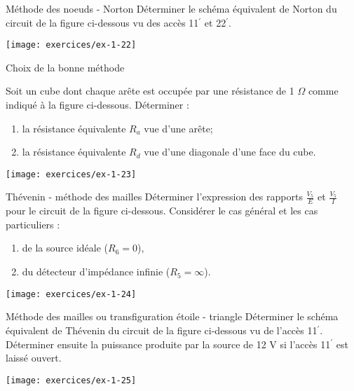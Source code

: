 \begin{exercise}{Méthode des noeuds - Norton}\label{ex:mg-5}
Déterminer le schéma équivalent de Norton du circuit
de la  figure ci-dessous vu des accès 11$^{'}$ et 22$^{'}$. 
\begin{center}
	\texttt{[image: exercices/ex-1-22]}
\end{center}
\end{exercise}

\begin{exercise}{Choix de la bonne méthode}\label{ex:mg-6}

Soit un cube dont chaque arête est occupée par une résistance
de 1 $\Omega$ comme indiqué à la  figure ci-dessous. Déterminer :
\begin{enumerate}
	\item la résistance équivalente $R_a$ vue d'une arête;
	\item la  résistance équivalente $R_d$ vue d'une diagonale d'une face du cube.
\end{enumerate}
\begin{center}
	\texttt{[image: exercices/ex-1-23]}
\end{center}
\end{exercise}

\begin{exercise}{Thévenin - méthode des mailles}\label{ex:mg-7}
Déterminer l'expression des rapports $\frac{V_5}{E}$ et $\frac{V_5}{I}$ pour le circuit de
la  figure ci-dessous. Considérer le cas général et les cas particuliers : 
\begin{enumerate}
	\item de la source idéale ($R_6=0$), 
	\item du détecteur d'impédance infinie
	($R_5=\infty$). 
\end{enumerate}
\begin{center}
	\texttt{[image: exercices/ex-1-24]}
\end{center}
\end{exercise}

\begin{exercise}{Méthode des mailles ou transfiguration étoile - triangle}\label{ex:mg-8}
Déterminer le schéma équivalent de Thévenin du circuit
de la  figure ci-dessous vu de l'accès 11$^{'}$. Déterminer ensuite la puissance
produite par la source de 12 V si l'accès 11$^{'}$ est laissé ouvert.
\begin{center}
	\texttt{[image: exercices/ex-1-25]}
\end{center}

\end{exercise}

